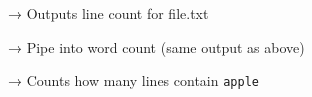 → Outputs line count for file.txt

    \begin{Shaded}
\begin{Highlighting}[]
\KeywordTok{|}  
\end{Highlighting}
\end{Shaded}

→ Pipe into word count (same output as above)

    \begin{Shaded}
\begin{Highlighting}[]
 \KeywordTok{|}  
\end{Highlighting}
\end{Shaded}

→ Counts how many lines contain \texttt{apple}


    
    
    
